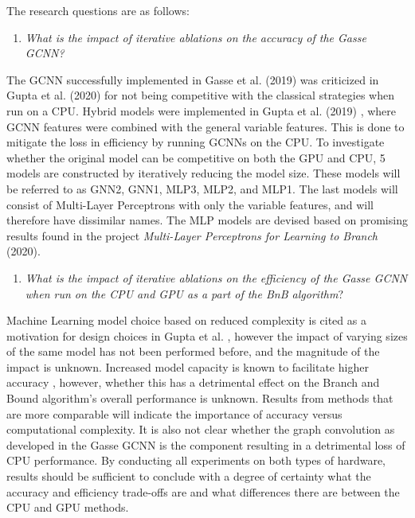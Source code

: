 The research questions are as follows:
%
\begin{enumerate}[label=(\roman*)]
    \item \textit{What is the impact of iterative ablations on the accuracy of the Gasse \gls{GCNN}?}
\end{enumerate}
%
The \gls{GCNN} successfully implemented in Gasse et al. (2019) \cite{gasse2019exact} was criticized in Gupta et al. (2020) for not being competitive with the classical strategies when run on a \gls{CPU}.
Hybrid models were implemented in Gupta et al. (2019) \cite{gupta2020hybrid}, where \Gls{GCNN} features were combined with the general variable features. This is done to mitigate the loss in efficiency by running \gls{GCNN}s on the \gls{CPU}. To investigate whether the original model can be competitive on both the \gls{GPU} and \gls{CPU}, 5 models are constructed by iteratively reducing the model size. These models will be referred to as GNN2, GNN1, MLP3, MLP2, and MLP1. The last models will consist of Multi-Layer Perceptrons with only the variable features, and will therefore have dissimilar names. The \gls{MLP} models are devised based on promising results found in the project \textit{Multi-Layer Perceptrons for Learning to Branch
} (2020).
%
\begin{enumerate}[resume*]
    \item \textit{What is the impact of iterative ablations on the efficiency of the Gasse \gls{GCNN} when run on the \gls{CPU} and \gls{GPU} as a part of the \gls{BnB} algorithm}?
\end{enumerate}
%
Machine Learning model choice based on reduced complexity is cited as a motivation for design choices in Gupta et al. \cite{gupta2020hybrid}, however the impact of varying sizes of the same model has not been performed before, and the magnitude of the impact is unknown. Increased model capacity is known to facilitate higher accuracy \cite{goodfellow2016deep}, however, whether this has a detrimental effect on the Branch and Bound algorithm's overall performance is unknown. Results from methods that are more comparable will indicate the importance of accuracy versus computational complexity. It is also not clear whether the graph convolution as developed in the Gasse \gls{GCNN} is the component resulting in a detrimental loss of \gls{CPU} performance. By conducting all experiments on both types of hardware, results should be sufficient to conclude with a degree of certainty what the accuracy and efficiency trade-offs are and what differences there are between the \gls{CPU} and \gls{GPU} methods. 
